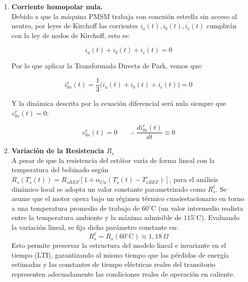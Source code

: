 \documentclass[blue,fullpaper]{ludusofficial}  %
\begin{document}
\begin{enumerate}
    \item \textbf{Corriente homopolar nula.} \\
    Debido a que la máquina PMSM trabaja con conexión estrella sin acceso al neutro, por leyes de Kirchoff las corrientes \(i_a(t), i_b(t), i_c(t)\) cumplirán con la ley de nodos de Kirchoff, esto es:

    \begin{equation}
\label{eq:corrientes-estrella}
        i_a(t) + i_b(t) + i_c(t) = 0 
    \end{equation}

    Por lo que aplicar la Transformada Directa de Park, vemos que:

    \begin{equation}
\label{eq:corriente-cero-nula}
        i_{0s}^{r}(t) = \frac{1}{3} \Big(  i_a(t) + i_b(t) + i_c(t)  \Big) = 0 
    \end{equation}
    
    Y la dinámica descrita por la ecuación diferencial será nula siempre que \(v_{0s}^{r}(t) = 0\):

    \begin{equation}
\label{eq:dinamica-cero-nula}
        v_{0s}^{r}(t) = 0 \qquad \therefore \; \frac{di_{0s}^{r}(t)}{dt}   \equiv 0   
    \end{equation}
    

    \item \textbf{Variación de la Resistencia \(R_s\)} \\
A pesar de que la resistencia del estátor varía de forma lineal con la temperatura del bobinado según $R_s(T_s^\circ(t)) = R_{sREF}[1 + \alpha_{Cu}(T_s^\circ(t) - T_{sREF}^\circ)]$, para el análisis dinámico local se adopta un valor constante parametrizado como $R_s^\ell$. Se asume que el motor opera bajo un régimen térmico cuasiestacionario en torno a una temperatura promedio de trabajo de $60^\circ\text{C}$ (un valor intermedio realista entre la temperatura ambiente y la máxima admisible de $115^\circ\text{C}$). Evaluando la variación lineal, se fija dicho parámetro constante en:
    \begin{equation}
\label{eq:resistencia-local}
        R_s^\ell = R_s(60^\circ\text{C}) \approx 1{,}18\,\Omega
    \end{equation}
Esto permite preservar la estructura del modelo lineal e invariante en el tiempo (LTI), garantizando al mismo tiempo que las pérdidas de energía estimadas y las constantes de tiempo eléctricas reales del transitorio representen adecuadamente las condiciones reales de operación en caliente.
    

\end{enumerate}
\end{document}
